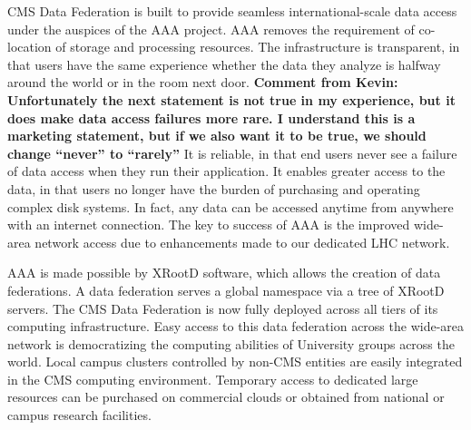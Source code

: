 \documentclass[11pt,a4paper]{article}
\begin{document}
CMS Data Federation is built to provide seamless international-scale data
access  under the auspices of the AAA project. AAA removes the requirement of co-location of storage and
processing resources.  The infrastructure is transparent, in that
users have the same experience whether the data they analyze is
halfway around the world or in the room next door.  {\bf Comment from Kevin:  Unfortunately the next statement is not true in my experience, but it does make data access failures more rare.  I understand this is a marketing statement, but if we also want it to be true, we should change ``never'' to ``rarely''}  It is reliable, in
that end users never see a failure of data access when they run their
application.  It enables greater access to the data, in that users no
longer have the burden of purchasing and operating complex disk
systems. In fact, any data can be accessed anytime from anywhere with
an internet connection. The key to success of AAA is the improved
wide-area network access due to enhancements made to our dedicated LHC
network.

AAA is made possible by XRootD software, which allows the creation of
data federations. A data federation serves a global namespace via a
tree of XRootD servers. 
The CMS Data Federation is now fully deployed across all tiers of its
computing infrastructure. Easy access to this data federation across
the wide-area network is democratizing the computing abilities of
University groups across the world. Local campus clusters controlled by
non-CMS entities are easily integrated in the CMS computing
environment. Temporary access to dedicated large resources can be
purchased on commercial clouds or obtained from national or campus
research facilities.
\end{document}
